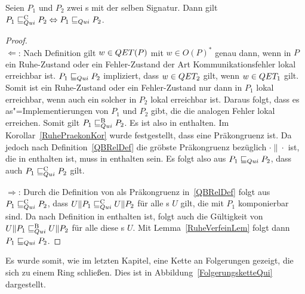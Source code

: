 \begin{Satz}
  \label{RuheVollAbstraktSatz}
  Seien $P_1$ und $P_2$ zwei \MEIO{}s mit der selben Signatur. Dann gilt
  $P_1 \sqsubseteq  _{Qui}^\mathrm{C} P_2\Leftrightarrow P_1 \sqsubseteq  _{Qui} P_2$.
\end{Satz}
\begin{proof}\mbox{}\\
  \glqq$\Leftarrow$\grqq{}: Nach Definition gilt $w\in QET (P)$ mit $w\in
  O(P)^*$ genau dann, wenn in $P$ ein Ruhe-Zustand oder ein Fehler-Zustand der
  Art Kommunikationsfehler lokal erreichbar ist. $P_1 \sqsubseteq  _{Qui} P_2$ impliziert,
  dass $w\in QET _2$ gilt, wenn $w\in QET _1$ gilt. Somit ist ein Ruhe-Zustand
  oder ein Fehler-Zustand nur dann in $P_1$ lokal erreichbar, wenn auch ein
  solcher in $P_2$ lokal erreichbar ist. Daraus folgt, dass es
  as"=Implementierungen von $P_1$ und $P_2$ gibt, die die analogen Fehler lokal
  erreichen. Somit gilt $P_1 \sqsubseteq  _{Qui}^\mathrm{B} P_2$. Es ist also \QRel{} in \QBRel{}
  enthalten. Im Korollar~\ref{RuhePraekonKor} wurde festgestellt, dass \QRel{}
  eine Präkongruenz ist. Da jedoch \QCRel{} nach Definition~\ref{QBRelDef} die
  gröbste Präkongruenz bezüglich $\cdot\|\cdot$ ist, die in \QBRel{} enthalten
  ist, muss \QRel{} in \QCRel{} enthalten sein. Es folgt also aus $P_1 \sqsubseteq  _{Qui}
  P_2$, dass auch $P_1 \sqsubseteq  _{Qui}^\mathrm{C} P_2$ gilt.

  \glqq$\Rightarrow$\grqq{}: Durch die Definition von \QCRel{} als Präkongruenz
  in~\ref{QBRelDef} folgt aus $P_1 \sqsubseteq  _{Qui}^\mathrm{C} P_2$, dass $U\|P_1 \sqsubseteq  _{Qui}^\mathrm{C} U\|P_2$ für
  alle \MEIO{}s $U$ gilt, die mit $P_1$ komponierbar sind. Da \QCRel{} nach
  Definition in \QBRel{} enthalten ist, folgt auch die Gültigkeit von
  $U\|P_1 \sqsubseteq  _{Qui}^\mathrm{B} U\|P_2$ für alle diese \MEIO{}s $U$. Mit
  Lemma~\ref{RuheVerfeinLem} folgt dann $P_1 \sqsubseteq  _{Qui} P_2$.
\end{proof}

Es wurde somit, wie im letzten Kapitel, eine Kette an Folgerungen gezeigt, die
sich zu einem Ring schließen. Dies ist in Abbildung~\ref{FolgerungsketteQui}
dargestellt.

